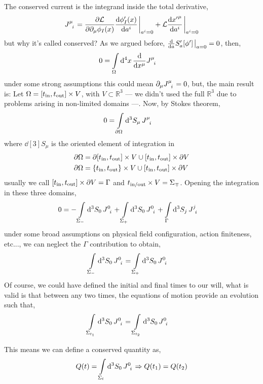 The conserved current is the integrand inside the total derivative,
\begin{align}
    \tensor{J}{^\mu_i} =\pdv{\mathcal L}{\partial_\mu\phi_ I\qty(x)}\dv{\phi_ I'\qty(x)}{a^i}\eval_{a^i=0}+\mathcal L\dv{{x'}^\mu}{a^i}\eval_{a^i=0}\label{eq:conservedcurrentnoether}
\end{align}
but why it's called conserved? As we argued before, $\dv{}{a}S_a'[\phi']\eval_{a=0}=0$, then,
\begin{align}
    0&= \int\limits_{\Omega}\dd[4]{x}\dv{}{x^\mu}\tensor{J}{^\mu_i}
\end{align}
under some strong assumptions this could mean $\partial_\mu\tensor{J}{^\mu_i}=0$, but, the main result is: 
Let $\Omega = [t_{\textnormal{in}},t_{\textnormal{out}}]\times V$, with $V\subset\mathbb R^3$ --- we didn't used the 
full $\mathbb R^3$ due to problems arising in non-limited domains ---. Now, by Stokes theorem,
\begin{align}
    0&= \int\limits_{\partial\Omega}\dd[3]{S_\mu}\tensor{J}{^\mu_i}
\end{align}
where $\dd[3]{S_\mu}$ is the oriented element of integration in 
\begin{align}
    \partial\Omega &= \partial [t_{\textnormal{in}},t_{\textnormal{out}}]\times V\cup [t_{\textnormal{in}},t_{\textnormal{out}}]\times \partial V\\
    \partial\Omega &= \qty{t_{\textnormal{in}},t_{\textnormal{out}}}\times V\cup [t_{\textnormal{in}},t_{\textnormal{out}}]\times \partial V
\end{align}
usually we call $[t_{\textnormal{in}},t_{\textnormal{out}}]\times \partial V=\Gamma$ and $t_{\textnormal{in/out}}\times V=\Sigma_\mp$. Opening the 
integration in these three domains,
\begin{align}
    0&= -\int\limits_{\Sigma_-}\dd[3]{S_0}\tensor{J}{^0_i}+\int\limits_{\Sigma_+}\dd[3]{S_0}\tensor{J}{^0_i}+\int\limits_{\Gamma}\dd[3]{S_j}\tensor{J}{^j_i}
\end{align}
under some broad assumptions on physical field configuration, action finiteness, etc..., we can neglect the $\Gamma$ contribution to obtain,
\begin{align}
    \int\limits_{\Sigma_-}\dd[3]{S_0}\tensor{J}{^0_i}&=\int\limits_{\Sigma_+}\dd[3]{S_0}\tensor{J}{^0_i}
\end{align}
Of course, we could have defined the initial and final times to our will, what is valid is that between 
any two times, the equations of motion provide an evolution such that,
\begin{align}
    \int\limits_{\Sigma_{t_1}}\dd[3]{S_0}\tensor{J}{^0_i}&=\int\limits_{\Sigma_{t_2}}\dd[3]{S_0}\tensor{J}{^0_i}
\end{align}

This means we can define a conserved quantity as,
\begin{align}
    Q\qty(t)=\int\limits_{\Sigma_{t}}\dd[3]{S_0}\tensor{J}{^0_i}\Rightarrow Q(t_1)=Q\qty(t_2)
\end{align}